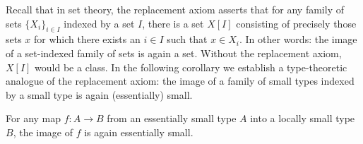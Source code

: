 Recall that in set theory, the replacement axiom asserts that for any family of sets $\{X_i\}_{i\in I}$ indexed by a set $I$, there is a set $X[I]$ consisting of precisely those sets $x$ for which there exists an $i\in I$ such that $x\in X_i$. In other words: the image of a set-indexed family of sets is again a set. Without the replacement axiom, $X[I]$ would be a class. In the following corollary we establish a type-theoretic analogue of the replacement axiom: the image of a family of small types indexed by a small type is again (essentially) small.

\begin{thm}\label{thm:replacement}
  For any map $f:A\to B$ from an essentially small type $A$ into a locally small type $B$, the image of $f$ is again essentially small.
\end{thm}

